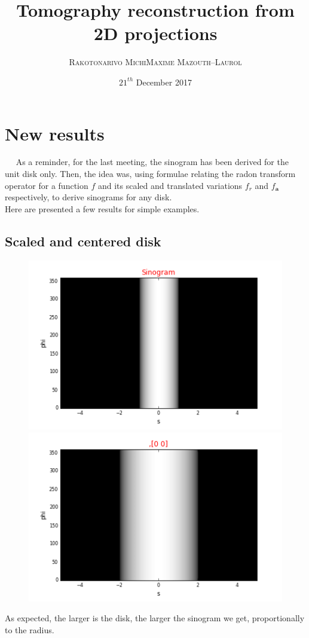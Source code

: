 \documentclass[a4,12pt]{article}
\title{\textbf{Tomography reconstruction from 2D projections}}
\author{
\begin{tabular}{cc}
	\textsc{Rakotonarivo Michi} & \textsc{Maxime Mazouth--Laurol}
\end{tabular}}
\date{\small $21^{th}$ December 2017}
\begin{document}
\maketitle
\section{New results}
~~ As a reminder, for the last meeting, the sinogram has been derived for the unit disk only. Then, the idea was, using formulae relating the radon transform operator for a function $f$ and its scaled and translated variations $f_{r}$ and $f_{\textbf{a}}$ respectively, to derive sinograms for any disk. \\
Here are presented a few results for simple examples.
\subsection{Scaled and centered disk}
\begin{figure}[h!]
   \begin{minipage}[c]{.46\linewidth}
      \includegraphics[scale=0.5]{../images/sinograms/unitDisk.png} 
   \end{minipage} \hfill
   \begin{minipage}[c]{.46\linewidth}
      \includegraphics[scale=0.5]{../images/sinograms/scaledUnitDisk.png} 
   \end{minipage}
\end{figure}
As expected, the larger is the disk, the larger the sinogram we get, proportionally to the radius.
\end{document}
